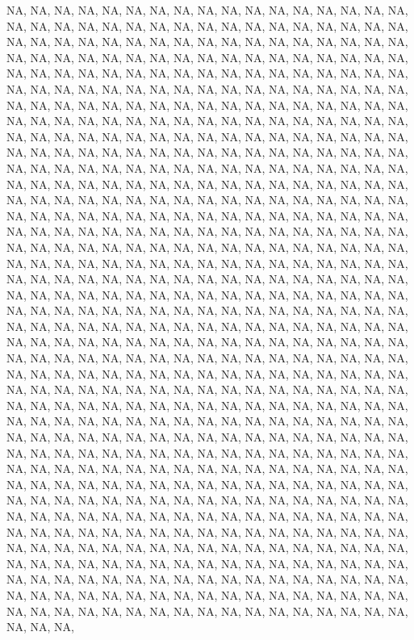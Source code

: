 \documentclass[12pt,]{article}
\begin{document}
NA, NA, NA, NA, NA, NA, NA, NA, NA, NA, NA, NA, NA, NA, NA, NA, NA, NA,
NA, NA, NA, NA, NA, NA, NA, NA, NA, NA, NA, NA, NA, NA, NA, NA, NA, NA,
NA, NA, NA, NA, NA, NA, NA, NA, NA, NA, NA, NA, NA, NA, NA, NA, NA, NA,
NA, NA, NA, NA, NA, NA, NA, NA, NA, NA, NA, NA, NA, NA, NA, NA, NA, NA,
NA, NA, NA, NA, NA, NA, NA, NA, NA, NA, NA, NA, NA, NA, NA, NA, NA, NA,
NA, NA, NA, NA, NA, NA, NA, NA, NA, NA, NA, NA, NA, NA, NA, NA, NA, NA,
NA, NA, NA, NA, NA, NA, NA, NA, NA, NA, NA, NA, NA, NA, NA, NA, NA, NA,
NA, NA, NA, NA, NA, NA, NA, NA, NA, NA, NA, NA, NA, NA, NA, NA, NA, NA,
NA, NA, NA, NA, NA, NA, NA, NA, NA, NA, NA, NA, NA, NA, NA, NA, NA, NA,
NA, NA, NA, NA, NA, NA, NA, NA, NA, NA, NA, NA, NA, NA, NA, NA, NA, NA,
NA, NA, NA, NA, NA, NA, NA, NA, NA, NA, NA, NA, NA, NA, NA, NA, NA, NA,
NA, NA, NA, NA, NA, NA, NA, NA, NA, NA, NA, NA, NA, NA, NA, NA, NA, NA,
NA, NA, NA, NA, NA, NA, NA, NA, NA, NA, NA, NA, NA, NA, NA, NA, NA, NA,
NA, NA, NA, NA, NA, NA, NA, NA, NA, NA, NA, NA, NA, NA, NA, NA, NA, NA,
NA, NA, NA, NA, NA, NA, NA, NA, NA, NA, NA, NA, NA, NA, NA, NA, NA, NA,
NA, NA, NA, NA, NA, NA, NA, NA, NA, NA, NA, NA, NA, NA, NA, NA, NA, NA,
NA, NA, NA, NA, NA, NA, NA, NA, NA, NA, NA, NA, NA, NA, NA, NA, NA, NA,
NA, NA, NA, NA, NA, NA, NA, NA, NA, NA, NA, NA, NA, NA, NA, NA, NA, NA,
NA, NA, NA, NA, NA, NA, NA, NA, NA, NA, NA, NA, NA, NA, NA, NA, NA, NA,
NA, NA, NA, NA, NA, NA, NA, NA, NA, NA, NA, NA, NA, NA, NA, NA, NA, NA,
NA, NA, NA, NA, NA, NA, NA, NA, NA, NA, NA, NA, NA, NA, NA, NA, NA, NA,
NA, NA, NA, NA, NA, NA, NA, NA, NA, NA, NA, NA, NA, NA, NA, NA, NA, NA,
NA, NA, NA, NA, NA, NA, NA, NA, NA, NA, NA, NA, NA, NA, NA, NA, NA, NA,
NA, NA, NA, NA, NA, NA, NA, NA, NA, NA, NA, NA, NA, NA, NA, NA, NA, NA,
NA, NA, NA, NA, NA, NA, NA, NA, NA, NA, NA, NA, NA, NA, NA, NA, NA, NA,
NA, NA, NA, NA, NA, NA, NA, NA, NA, NA, NA, NA, NA, NA, NA, NA, NA, NA,
NA, NA, NA, NA, NA, NA, NA, NA, NA, NA, NA, NA, NA, NA, NA, NA, NA, NA,
NA, NA, NA, NA, NA, NA, NA, NA, NA, NA, NA, NA, NA, NA, NA, NA, NA, NA,
NA, NA, NA, NA, NA, NA, NA, NA, NA, NA, NA, NA, NA, NA, NA, NA, NA, NA,
NA, NA, NA, NA, NA, NA, NA, NA, NA, NA, NA, NA, NA, NA, NA, NA, NA, NA,
NA, NA, NA, NA, NA, NA, NA, NA, NA, NA, NA, NA, NA, NA, NA, NA, NA, NA,
NA, NA, NA, NA, NA, NA, NA, NA, NA, NA, NA, NA, NA, NA, NA, NA, NA, NA,
NA, NA, NA, NA, NA, NA, NA, NA, NA, NA, NA, NA, NA, NA, NA, NA, NA, NA,
NA, NA, NA, NA, NA, NA, NA, NA, NA, NA, NA, NA, NA, NA, NA, NA, NA, NA,
NA, NA, NA, NA, NA, NA, NA, NA, NA, NA, NA, NA, NA, NA, NA, NA, NA, NA,
NA, NA, NA, NA, NA, NA, NA, NA, NA, NA, NA, NA, NA, NA, NA, NA, NA, NA,
NA, NA, NA, NA, NA, NA, NA, NA, NA, NA, NA, NA, NA, NA, NA, NA, NA, NA,
\end{document}
